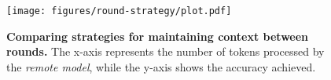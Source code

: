 


\begin{figure}[t]
    \centering
    \texttt{[image: figures/round-strategy/plot.pdf]}
    \caption{\textbf{Comparing strategies for maintaining context between \system rounds.} The x-axis represents the number of tokens processed by the \textit{remote model}, while the y-axis shows the accuracy achieved.}
    \label{fig:round-strategy}
\end{figure}


